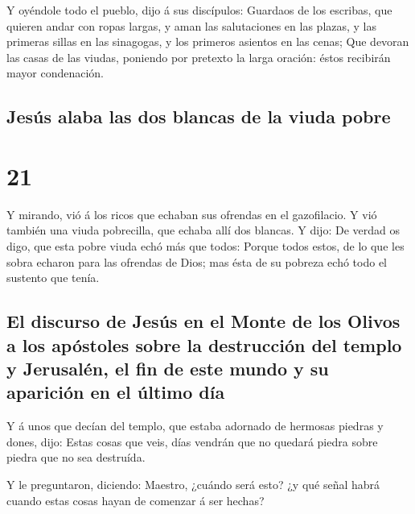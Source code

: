  Y oyéndole todo el pueblo, dijo á sus discípulos:
 Guardaos de los escribas, que quieren andar con ropas
largas, y aman las salutaciones en las plazas, y las primeras sillas en
las sinagogas, y los primeros asientos en las cenas;  Que
devoran las casas de las viudas, poniendo por pretexto la larga oración:
éstos recibirán mayor condenación.

\hypertarget{jesuxfas-alaba-las-dos-blancas-de-la-viuda-pobre}{%
\subsection{Jesús alaba las dos blancas de la viuda
pobre}\label{jesuxfas-alaba-las-dos-blancas-de-la-viuda-pobre}}

\hypertarget{section-42-21}{%
\section{21}\label{section-42-21}}

 Y mirando, vió á los ricos que echaban sus ofrendas en el
gazofilacio.  Y vió también una viuda pobrecilla, que
echaba allí dos blancas.  Y dijo: De verdad os digo, que
esta pobre viuda echó más que todos:  Porque todos estos,
de lo que les sobra echaron para las ofrendas de Dios; mas ésta de su
pobreza echó todo el sustento que tenía.

\hypertarget{el-discurso-de-jesuxfas-en-el-monte-de-los-olivos-a-los-apuxf3stoles-sobre-la-destrucciuxf3n-del-templo-y-jerusaluxe9n-el-fin-de-este-mundo-y-su-apariciuxf3n-en-el-uxfaltimo-duxeda}{%
\subsection{El discurso de Jesús en el Monte de los Olivos a los
apóstoles sobre la destrucción del templo y Jerusalén, el fin de este
mundo y su aparición en el último
día}\label{el-discurso-de-jesuxfas-en-el-monte-de-los-olivos-a-los-apuxf3stoles-sobre-la-destrucciuxf3n-del-templo-y-jerusaluxe9n-el-fin-de-este-mundo-y-su-apariciuxf3n-en-el-uxfaltimo-duxeda}}

 Y á unos que decían del templo, que estaba adornado de
hermosas piedras y dones, dijo:  Estas cosas que veis,
días vendrán que no quedará piedra sobre piedra que no sea destruída.

 Y le preguntaron, diciendo: Maestro, ¿cuándo será esto?
¿y qué señal habrá cuando estas cosas hayan de comenzar á ser hechas?

